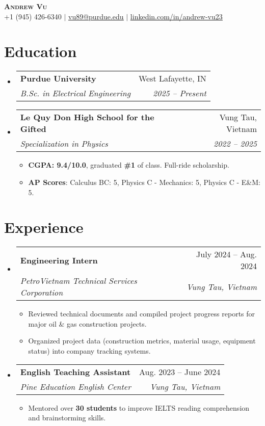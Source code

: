 \documentclass[letterpaper,11pt]{article}
\makeatletter
\newcommand{\resumeItem}[1]{
  \item\small{
    {#1 \vspace{-2pt}}
  }
}
\newcommand{\resumeSubheading}[4]{
  \vspace{-2pt}\item
    \begin{tabular*}{0.97\textwidth}[t]{l@{\extracolsep{\fill}}r}
      \textbf{#1} & #2 \\
      \textit{\small#3} & \textit{\small #4} \\
    \end{tabular*}\vspace{-6pt}
}
\newcommand{\resumeSubHeadingListStart}{\begin{itemize}[leftmargin=0.15in, label={}]}
\newcommand{\resumeSubHeadingListEnd}{\end{itemize}}
\newcommand{\resumeItemListStart}{\begin{itemize}[topsep=1pt, itemsep=1pt]}
\newcommand{\resumeItemListEnd}{\end{itemize}\vspace{-4pt}}
\makeatother
\begin{document}
\begin{center}
    \textbf{\Huge \scshape Andrew Vu} \\ \vspace{1pt}
    \small +1 (945) 426-6340 $|$ \href{mailto:vu89@purdue.edu}{\underline{vu89@purdue.edu}} $|$ 
    \href{https://www.linkedin.com/in/andrew-vu23/}{\underline{linkedin.com/in/andrew-vu23}}
\end{center}

\section{Education}
  \resumeSubHeadingListStart
    \resumeSubheading
      {Purdue University}{West Lafayette, IN}
      {B.Sc. in Electrical Engineering}{2025 -- Present}
    \resumeSubheading
      {Le Quy Don High School for the Gifted}{Vung Tau, Vietnam}
      {Specialization in Physics}{2022 -- 2025}
      \resumeItemListStart
        \resumeItem{\textbf{CGPA: 9.4/10.0}, graduated \textbf{\#1} of class. Full-ride scholarship.} 
        \resumeItem{\textbf{AP Scores}: Calculus BC: 5, Physics C - Mechanics: 5, Physics C - E\&M: 5.}
     \resumeItemListEnd
  \resumeSubHeadingListEnd

\section{Experience}
  \resumeSubHeadingListStart
    \resumeSubheading
      {Engineering Intern}{July 2024 -- Aug. 2024}
      {PetroVietnam Technical Services Corporation}{Vung Tau, Vietnam}
      \resumeItemListStart
        \resumeItem{Reviewed technical documents and compiled project progress reports for major oil \& gas construction projects.}
        \resumeItem{Organized project data (construction metrics, material usage, equipment status) into company tracking systems.}
      \resumeItemListEnd
    \resumeSubheading
      {English Teaching Assistant}{Aug. 2023 -- June 2024}
      {Pine Education English Center}{Vung Tau, Vietnam}
      \resumeItemListStart
        \resumeItem{Mentored over \textbf{30 students} to improve IELTS reading comprehension and brainstorming skills.}
      \resumeItemListEnd
  \resumeSubHeadingListEnd

\end{document}
